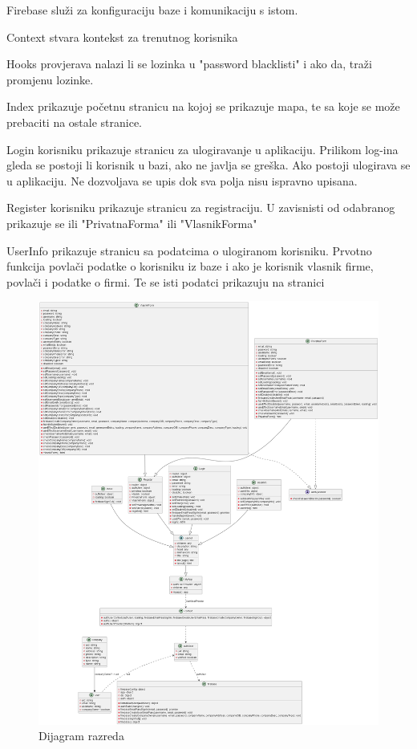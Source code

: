 	        Firebase služi za konfiguraciju baze i komunikaciju s istom. 
	        
	        Context stvara kontekst za trenutnog korisnika
	        
	        Hooks provjerava nalazi li se lozinka u "password blacklisti" i ako da, traži promjenu lozinke.

            Index prikazuje početnu stranicu na kojoj se prikazuje mapa, te sa koje se može prebaciti na ostale stranice.
            
	        Login korisniku prikazuje stranicu za ulogiravanje u aplikaciju. Prilikom log-ina gleda se postoji li korisnik u bazi, ako ne javlja se greška. Ako postoji ulogirava se u aplikaciju. Ne dozvoljava se upis dok sva polja nisu ispravno upisana.
	        
	        Register korisniku prikazuje stranicu za registraciju. U zavisnisti od odabranog prikazuje se ili "PrivatnaForma" ili "VlasnikForma"
	        
	        UserInfo prikazuje stranicu sa podatcima o ulogiranom korisniku. Prvotno funkcija povlači podatke o korisniku iz baze i ako je korisnik vlasnik firme, povlači i podatke o firmi. Te se isti podatci prikazuju na stranici
	        
	        \begin{figure}[H]
			\includegraphics[scale=0.2]{slike/DijagramRazreda.png}
			\centering
			\caption{Dijagram razreda}
			\label{fig:promjene}
		          \end{figure}
			


